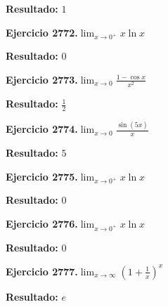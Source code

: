 \documentclass[10pt,a4paper]{article}
\begin{document}
\begin{solbox}
\textbf{Resultado:} \(\displaystyle 1\)
\end{solbox}

\newpage
\begin{ejbox}
\textbf{Ejercicio 2772.}\quad $\lim_{x\to 0^+} x\ln x$
\end{ejbox}

\begin{solbox}
\textbf{Resultado:} \(\displaystyle 0\)
\end{solbox}

\begin{ejbox}
\textbf{Ejercicio 2773.}\quad $\lim_{x\to 0} \frac{1-\cos x}{x^2}$
\end{ejbox}

\begin{solbox}
\textbf{Resultado:} \(\displaystyle \frac{1}{2}\)
\end{solbox}

\begin{ejbox}
\textbf{Ejercicio 2774.}\quad $\lim_{x\to 0} \frac{\sin(5x)}{x}$
\end{ejbox}

\begin{solbox}
\textbf{Resultado:} \(\displaystyle 5\)
\end{solbox}

\newpage
\begin{ejbox}
\textbf{Ejercicio 2775.}\quad $\lim_{x\to 0^+} x\ln x$
\end{ejbox}

\begin{solbox}
\textbf{Resultado:} \(\displaystyle 0\)
\end{solbox}

\begin{ejbox}
\textbf{Ejercicio 2776.}\quad $\lim_{x\to 0^+} x\ln x$
\end{ejbox}

\begin{solbox}
\textbf{Resultado:} \(\displaystyle 0\)
\end{solbox}

\begin{ejbox}
\textbf{Ejercicio 2777.}\quad $\lim_{x\to \infty} \left(1+\frac{1}{x}\right)^x$
\end{ejbox}

\begin{solbox}
\textbf{Resultado:} \(\displaystyle e\)
\end{solbox}
\end{document}
